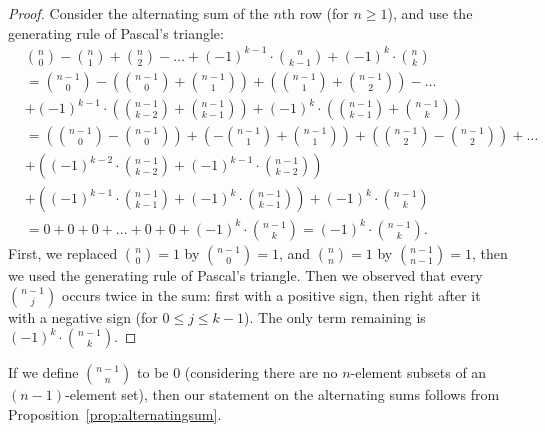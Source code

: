 \begin{proof}
Consider the alternating sum of the $n$th row (for $n\geq 1$), 
and use the generating rule of Pascal's triangle: 
\begin{align*}
& \binom{n}{0} - \binom{n}{1} + \binom{n}{2} - \dots + \left( -1 \right)^{k-1} \cdot \binom{n}{k-1} + \left( -1 \right)^{k} \cdot \binom{n}{k}  \\
&= \binom{n-1}{0} - \left( \binom{n-1}{0} + \binom{n-1}{1} \right) + \left( \binom{n-1}{1} + \binom{n-1}{2} \right)  - \dots \\
&+ %
(-1)^{k-1} \cdot \left( \binom{n-1}{k-2} + \binom{n-1}{k-1} \right) + (-1)^{k} \cdot \left( \binom{n-1}{k-1} + \binom{n-1}{k} \right) \\
&= \left( \binom{n-1}{0} - \binom{n-1}{0} \right) + \left( - \binom{n-1}{1} + \binom{n-1}{1} \right) + \left( \binom{n-1}{2} - \binom{n-1}{2} \right) + \dots \\
&+ \left( \left( -1 \right)^{k-2} \cdot \binom{n-1}{k-2} + \left( -1 \right)^{k-1} \cdot \binom{n-1}{k-2} \right)  \\
&+ \left( \left( -1 \right)^{k-1} \cdot \binom{n-1}{k-1} + \left( -1 \right)^{k} \cdot \binom{n-1}{k-1} \right) + \left( -1 \right)^k \cdot \binom{n-1}{k} \\
&= 0 + 0 + 0 + \dots + 0 + 0 + \left( -1 \right)^k \cdot \binom{n-1}{k} = \left( -1 \right)^k \cdot \binom{n-1}{k}. 
\end{align*}
First, we replaced $\binom{n}{0}=1$ by $\binom{n-1}{0}=1$, 
and $\binom{n}{n} = 1$ by $\binom{n-1}{n-1} = 1$, then we used the generating rule of Pascal's triangle. 
Then we observed that every $\binom{n-1}{j}$ occurs twice in the sum: first with a positive sign, then right after it with a negative sign 
(for $0\leq j\leq k-1$). 
The only term remaining is $\left( -1 \right)^k \cdot \binom{n-1}{k}$. 
\end{proof}

If we define $\binom{n-1}{n}$ to be 0 
(considering there are no $n$-element subsets of an $(n-1)$-element set), 
then our statement on the alternating sums follows from Proposition~\ref{prop:alternatingsum}. 

